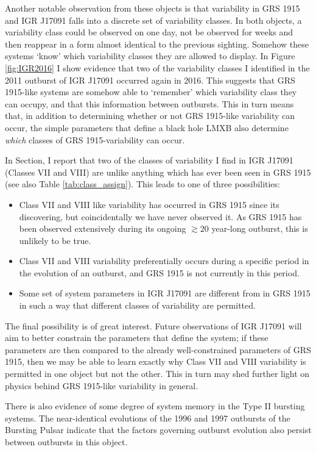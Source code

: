 \par Another notable observation from these objects is that variability in GRS 1915 and IGR J17091 falls into a discrete set of variability classes.  In both objects, a variability class could be observed on one day, not be observed for weeks and then reappear in a form almost identical to the previous sighting.  Somehow these systems `know' which variability classes they are allowed to display.  In Figure \ref{fig:IGR2016} I show evidence that two of the variability classes I identified in the 2011 outburst of IGR J17091 occurred again in 2016.  This suggests that GRS 1915-like systems are somehow able to `remember' which variability class they can occupy, and that this information between outbursts.  This in turn means that, in addition to determining whether or not GRS 1915-like variability can occur, the simple parameters that define a black hole LMXB also determine \textit{which} classes of GRS 1915-variability can occur.
\par In Section, I report that two of the classes of variability I find in IGR J17091 (Classes VII and VIII) are unlike anything which has ever been seen in GRS 1915 (see also Table \ref{tab:class_assign}).  This leads to one of three possibilities:
\begin{itemize}
\item Class VII and VIII like variability has occurred in GRS 1915 since its discovering, but coincidentally we have never observed it.  As GRS 1915 has been observed extensively during its ongoing $\gtrsim20$ year-long outburst, this is unlikely to be true.
\item Class VII and VIII variability preferentially occurs during a specific period in the evolution of an outburst, and GRS 1915 is not currently in this period.
\item Some set of system parameters in IGR J17091 are different from in GRS 1915 in such a way that different classes of variability are permitted.
\end{itemize}
\par The final possibility is of great interest.  Future observations of IGR J17091 will aim to better constrain the parameters that define the system; if these parameters are then compared to the already well-constrained parameters of GRS 1915, then we may be able to learn exactly why Class VII and VIII variability is permitted in one object but not the other.  This in turn may shed further light on physics behind GRS 1915-like variability in general.
\par There is also evidence of some degree of system memory in the Type II bursting systems.  The near-identical evolutions of the 1996 and 1997 outbursts of the Bursting Pulsar indicate that the factors governing outburst evolution also persist between outbursts in this object.
